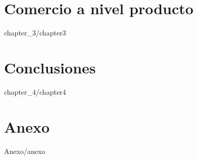 \documentclass[11pt,a4paper]{tesis}
\begin{document}
%
%
%
%
%
%


\chapter[Comercio a nivel producto]{Comercio a nivel producto} \label{sec:desagregado}




{chapter_3/chapter3}



\chapter{Conclusiones} \label{sec:conclusiones}


{chapter_4/chapter4}

\chapter*{Anexo}\label{append}
\renewcommand{\thesubsection}{\Alph{subsection}}

{Anexo/anexo}



\backmatter
%


%
\end{document}
